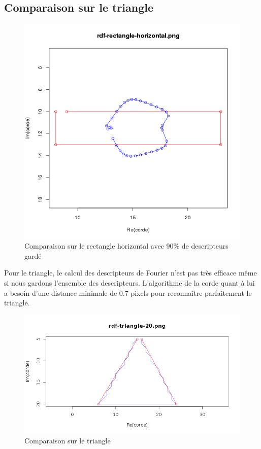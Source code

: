 \documentclass[11pt]{article}
\begin{document}
  \subsection{Comparaison sur le triangle}

  \begin{center}
    \begin{figure}[!h]
      \includegraphics[width=13cm]{../resultat/comp_rate_rect.png}
      \caption{Comparaison sur le rectangle horizontal avec 90\% de descripteurs gardé}
    \end{figure}
  \end{center}
  
  \newpage
  
  Pour le triangle, le calcul des descripteurs de Fourier n'est pas très efficace même si nous gardons
  l'ensemble des descripteurs. L'algorithme de la corde quant à lui a besoin d'une distance minimale de 0.7 pixels pour
  reconnaître parfaitement le triangle.
  
  \begin{center}
    \begin{figure}[!h]
      \includegraphics[width=15cm]{../resultat/comp_triangle.png}
      \caption{Comparaison sur le triangle}
    \end{figure}
  \end{center}
  
\end{document}
